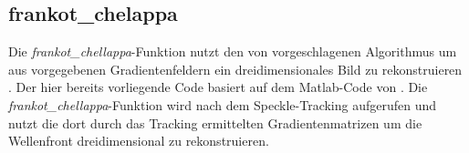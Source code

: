 \subsection{frankot\_chelappa}

Die \textit{frankot\_chellappa}-Funktion nutzt den von \citeauthor{FC88} vorgeschlagenen Algorithmus um aus vorgegebenen Gradientenfeldern ein dreidimensionales Bild zu rekonstruieren \cite{FC88}. Der hier bereits vorliegende Code basiert auf dem Matlab-Code von \citeauthor{Kov04} \cite{Kov04}. Die \textit{frankot\_chellappa}-Funktion wird nach dem Speckle-Tracking aufgerufen und nutzt die dort durch das Tracking ermittelten Gradientenmatrizen um die Wellenfront dreidimensional zu rekonstruieren. 